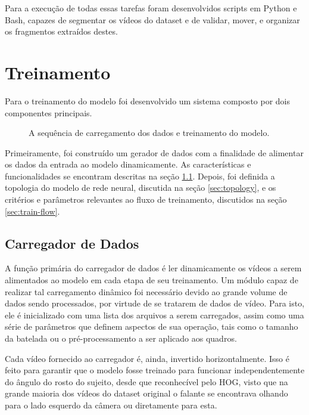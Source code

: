 Para a execução de todas essas tarefas foram desenvolvidos scripts em Python e Bash, capazes de segmentar os vídeos do dataset e de validar, mover, e organizar os fragmentos extraídos destes.

\section{Treinamento}
\label{sec:train}

Para o treinamento do modelo foi desenvolvido um sistema composto por dois componentes principais.

\begin{figure}[ht]
    \centering
    \fontsize{10pt}{10pt}\selectfont
    
    \caption{A sequência de carregamento dos dados e treinamento do modelo.}
    \label{fig:arch_train}
\end{figure}

Primeiramente, foi construído um gerador de dados com a finalidade de alimentar os dados da entrada ao modelo dinamicamente. As características e funcionalidades se encontram descritas na seção \ref{sec:data-gen}.
Depois, foi definida a topologia do modelo de rede neural, discutida na seção \ref{sec:topology}, e os critérios e parâmetros relevantes ao fluxo de treinamento, discutidos na seção \ref{sec:train-flow}.

\subsection{Carregador de Dados}
\label{sec:data-gen}
A função primária do carregador de dados é ler dinamicamente os vídeos a serem alimentados ao modelo em cada etapa de seu treinamento.
Um módulo capaz de realizar tal carregamento dinâmico foi necessário devido ao grande volume de dados sendo processados, por virtude de se tratarem de dados de vídeo.
Para isto, ele é inicializado com uma lista dos arquivos a serem carregados, assim como uma série de parâmetros que definem aspectos de sua operação, tais como o tamanho da batelada ou o pré-processamento a ser aplicado aos quadros.

Cada vídeo fornecido ao carregador é, ainda, invertido horizontalmente.
Isso é feito para garantir que o modelo fosse treinado para funcionar independentemente do ângulo do rosto do sujeito, desde que reconhecível pelo HOG, visto que na grande maioria dos vídeos do dataset original o falante se encontrava olhando para o lado esquerdo da câmera ou diretamente para esta.

